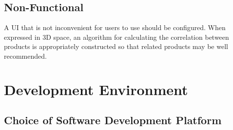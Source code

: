 \documentclass[conference]{IEEEtran}
\begin{document}
\subsection{Non-Functional} 

A UI that is not inconvenient for users to use should be configured. When expressed in 3D space, an algorithm for calculating the correlation between products is appropriately constructed so that related products may be well recommended.

\section{Development Environment}

\subsection{Choice of Software Development Platform}
\end{document}

